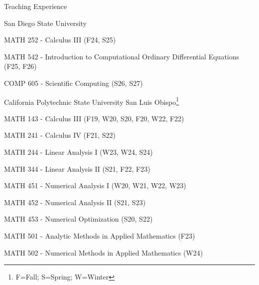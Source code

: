 \documentclass[10pt]{article} %
\newenvironment{outerlist}[1][\enskip\textbullet]%
        {\begin{itemize}[#1]}{\end{itemize}%
         \vspace{-.6\baselineskip}}
\newenvironment{innerlist}[1][\enskip\textbullet]%
        {\begin{compactitem}[#1]}{\end{compactitem}}
\begin{document}
\begin{section}{Teaching Experience}
\begin{outerlist}

\item[$\bullet$] \vskip -7mm
San Diego State University
\begin{innerlist}
\item[$\triangleright$] MATH 252 - Calculus III (F24, S25)
\item[$\triangleright$] MATH 542 - Introduction to Computational Ordinary Differential Equations (F25, F26)
\item[$\triangleright$] COMP 605 - Scientific Computing (S26, S27)
\end{innerlist}

\item[$\bullet$]
California Polytechnic State University San Luis Obispo\footnote{\label{note1}F=Fall; S=Spring; W=Winter}
\begin{innerlist}
\item[$\triangleright$] MATH 143 - Calculus III (F19, W20, S20, F20, W22, F22)
\item[$\triangleright$] MATH 241 - Calculus IV (F21, S22)
\item[$\triangleright$] MATH 244 - Linear Analysis I (W23, W24, S24)
\item[$\triangleright$] MATH 344 - Linear Analysis II (S21, F22, F23)
\item[$\triangleright$] MATH 451 - Numerical Analysis I (W20, W21, W22, W23)
\item[$\triangleright$] MATH 452 - Numerical Analysis II (S21, S23)
\item[$\triangleright$] MATH 453 - Numerical Optimization (S20, S22)
\item[$\triangleright$] MATH 501 - Analytic Methods in Applied Mathematics (F23)
\item[$\triangleright$] MATH 502 - Numerical Methods in Applied Mathematics (W24)
\end{innerlist}


\end{outerlist}
\end{section}
\end{document}

